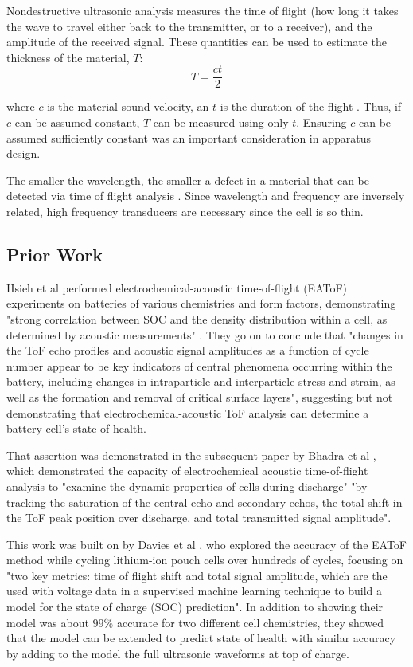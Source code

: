 Nondestructive ultrasonic analysis measures the time of flight (how long it takes the wave to travel either back to the transmitter, or to a receiver), and the amplitude of the received signal. 
These quantities can be used to estimate the thickness of the material, $T$:
$$ T = \frac{ct}{2}$$

where $c$ is the material sound velocity, an $t$ is the duration of the flight \cite{OLYMPUS}. 
Thus, if $c$ can be assumed constant, $T$ can be measured using only $t$.
Ensuring $c$ can be assumed sufficiently constant was an important consideration in apparatus design.

The smaller the wavelength, the smaller a defect in a material that can be detected via time of flight analysis \cite{OLYMPUS}. Since wavelength and frequency are inversely related, high frequency transducers are necessary since the cell is so thin.

\subsection{Prior Work}

Hsieh et al performed electrochemical-acoustic time-of-flight (EAToF) experiments on batteries of various chemistries and form factors, demonstrating "strong correlation between SOC and the density distribution within a cell, as determined by acoustic measurements" \cite{TOF-STATE}. They go on to conclude that "changes in the ToF echo profiles and acoustic signal amplitudes as a function of cycle number appear to be key indicators of central phenomena occurring within the battery, including changes in intraparticle and interparticle stress and strain, as well as the formation and removal of critical surface layers", suggesting but not demonstrating that electrochemical-acoustic ToF analysis can determine a battery cell's state of health.

That assertion was demonstrated in the subsequent paper by Bhadra et al \cite{ANODE-CHAR}, which demonstrated the capacity of electrochemical acoustic time-of-flight analysis to "examine the dynamic properties of cells during discharge" "by tracking the saturation of the central echo and secondary echos, the total shift in the ToF peak position over discharge, and total transmitted signal amplitude".

This work was built on by Davies et al \cite{SOC-SOH-EST}, who explored the accuracy of the EAToF method while cycling lithium-ion pouch cells over hundreds of cycles, focusing on "two key metrics: time of flight shift and total signal amplitude, which are the used with voltage data in a supervised machine learning technique to build a model for the state of charge (SOC) prediction". 
In addition to showing their model was about $99\%$ accurate for two different cell chemistries, they showed that the model can be extended to predict state of health with similar accuracy by adding to the model the full ultrasonic waveforms at top of charge.